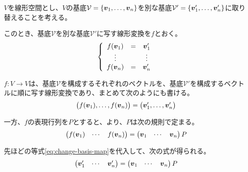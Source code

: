 \documentclass[../../../topic_linear-algebra]{subfiles}
\begin{document}
$V$を線形空間とし、$V$の基底$\mathcal{V} = \{\vb*{v}_1, \ldots, \vb*{v}_n\}$を別な基底$\mathcal{V}' = \{\vb*{v}'_1, \ldots, \vb*{v}'_n\}$に取り替えることを考える。

\br

このとき、基底$\mathcal{V}$を別な基底$\mathcal{V}'$に写す線形変換を$f$とおく。
\begin{equation*}
  \left\{
  \begin{array}{ccc}
    f(\vb*{v}_1) & = & \vb*{v}'_1 \\
    \vdots       &   & \vdots     \\
    f(\vb*{v}_n) & = & \vb*{v}'_n
  \end{array}
  \right.
\end{equation*}

$f\colon V \to V$は、基底$\mathcal{V}$を構成するそれぞれのベクトルを、基底$\mathcal{V}'$を構成するベクトルに順に写す線形変換であり、まとめて次のようにも書ける。
\begin{equation}\label{eq:change-basis-map}
  \begin{pmatrix}
    f(\vb*{v}_1), \ldots, f(\vb*{v}_n)
  \end{pmatrix} = \begin{pmatrix}
    \vb*{v}'_1, \ldots, \vb*{v}'_n
  \end{pmatrix}
\end{equation}

\br

一方、$f$の表現行列を$P$とすると、より、$P$は次の規則で定まる。
\begin{equation*}
  \begin{pmatrix}
    f(\vb*{v}_1) & \cdots & f(\vb*{v}_n)
  \end{pmatrix} = \begin{pmatrix}
    \vb*{v}_1 & \cdots & \vb*{v}_n
  \end{pmatrix} P
\end{equation*}

先ほどの等式\eqref{eq:change-basis-map}を代入して、次の式が得られる。
\begin{equation*}
  \begin{pmatrix}
    \vb*{v}'_1 & \cdots & \vb*{v}'_n
  \end{pmatrix} = \begin{pmatrix}
    \vb*{v}_1 & \cdots & \vb*{v}_n
  \end{pmatrix} P
\end{equation*}

\br
\end{document}

